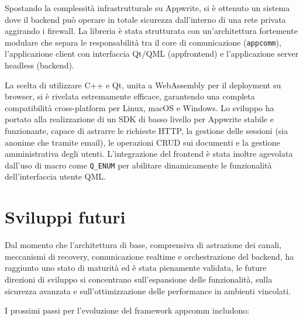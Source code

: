 \documentclass[a4paper, 11pt, twoside]{report}
\begin{document}
Spostando la complessità infrastrutturale su Appwrite, si è ottenuto un sistema dove il backend può operare in totale sicurezza
dall'interno di una rete privata aggirando i firewall. La libreria è stata strutturata con un'architettura fortemente modulare che
separa le responsabilità tra il core di comunicazione (\texttt{appcomm}), l'applicazione client con interfaccia Qt/QML (appfrontend) 
e l'applicazione server headless (backend).

La scelta di utilizzare C++ e Qt, unita a WebAssembly per il deployment su browser, si è rivelata estremamente efficace, garantendo
una completa compatibilità cross-platform per Linux, macOS e Windows. Lo sviluppo ha portato alla realizzazione di un SDK di basso
livello per Appwrite stabile e funzionante, capace di astrarre le richieste HTTP, la gestione delle sessioni (sia anonime che tramite
email), le operazioni CRUD sui documenti e la gestione amministrativa degli utenti. 
L'integrazione del frontend è stata inoltre agevolata dall'uso di macro come \texttt{Q\_ENUM} per abilitare dinamicamente le funzionalità 
dell'interfaccia utente QML.

\section{Sviluppi futuri}

Dal momento che l'architettura di base, comprensiva di astrazione dei canali, meccanismi di recovery, comunicazione realtime e
orchestrazione del backend, ha raggiunto uno stato di maturità ed è stata pienamente validata, le future direzioni di sviluppo si
concentrano sull'espansione delle funzionalità, sulla sicurezza avanzata e sull'ottimizzazione delle performance in ambienti vincolati.

I prossimi passi per l'evoluzione del framework appcomm includono:
\end{document}
